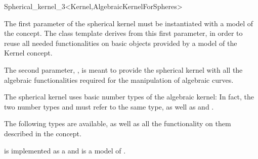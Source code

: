 \begin{ccRefClass}{Spherical_kernel_3<Kernel,AlgebraicKernelForSpheres>}


\ccIsModel


\ccParameters

The first parameter of the spherical kernel must be instantiated with
a model of the  concept. The 
class template derives from this first parameter, in order to reuse
all needed functionalities on basic objects provided by a model of the
Kernel concept. 

The second parameter, , is meant to provide the
spherical kernel with all the algebraic functionalities required for the
manipulation of algebraic curves. 

\ccInheritsFrom


\ccTypes

\ccThreeToTwo

The spherical kernel uses basic number types of the algebraic kernel:
In fact, the two number types  and
 must refer to the same type, as well as
 and .

The following types are available, as well as all the functionality on
them described in the  concept. 

\ccGlue
{}
\ccGlue
{}
\ccGlue
{}

 is implemented as a 
 and is a model 
of .

\ccSeeAlso

\\
\\

\end{ccRefClass}
